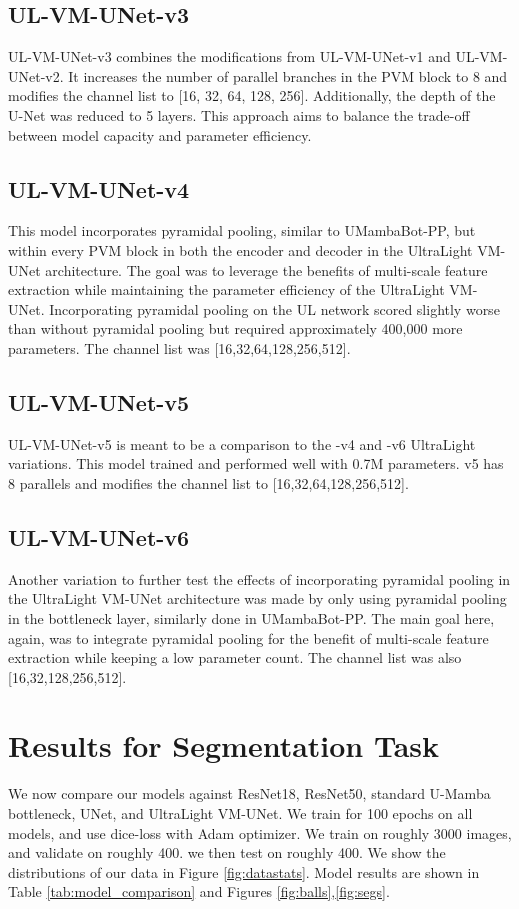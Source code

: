 \documentclass[conference]{IEEEtran}
\begin{document}
\subsection{UL-VM-UNet-v3}
UL-VM-UNet-v3 combines the modifications from UL-VM-UNet-v1 and UL-VM-UNet-v2. It increases the number of parallel branches in the PVM block to 8 and modifies the channel list to [16, 32, 64, 128, 256]. Additionally, the depth of the U-Net was reduced to 5 layers. This approach aims to balance the trade-off between model capacity and parameter efficiency.

\subsection{UL-VM-UNet-v4}
This model incorporates pyramidal pooling, similar to UMambaBot-PP, but within every PVM block in both the encoder and decoder in the UltraLight VM-UNet architecture. The goal was to leverage the benefits of multi-scale feature extraction while maintaining the parameter efficiency of the UltraLight VM-UNet. Incorporating pyramidal pooling on the UL network scored slightly worse than without pyramidal pooling but required approximately 400,000 more parameters. The channel list was [16,32,64,128,256,512].

\subsection{UL-VM-UNet-v5}
UL-VM-UNet-v5 is meant to be a comparison to the -v4 and -v6 UltraLight variations. This model trained and performed well with 0.7M parameters. v5 has 8 parallels and modifies the channel list to [16,32,64,128,256,512].

\subsection{UL-VM-UNet-v6}
Another variation to further test the effects of incorporating pyramidal pooling in the UltraLight VM-UNet architecture was made by only using pyramidal pooling in the bottleneck layer, similarly done in UMambaBot-PP. The main goal here, again, was to integrate pyramidal pooling for the benefit of multi-scale feature extraction while keeping a low parameter count. The channel list was also [16,32,128,256,512].

\section{Results for Segmentation Task}
We now compare our models against ResNet18, ResNet50, standard U-Mamba bottleneck, UNet, and UltraLight VM-UNet. We train for 100 epochs on all models, and use dice-loss with Adam optimizer. We train on roughly 3000 images, and validate on roughly 400. we then test on roughly 400. We show the distributions of our data in Figure \ref{fig:datastats}.
Model results are shown in Table \ref{tab:model_comparison} and Figures \ref{fig:balls},\ref{fig:segs}.
\end{document}
